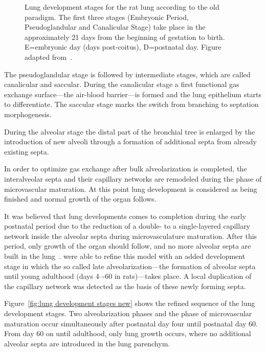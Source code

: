 \begin{figure}[htb]
	\noindent\makebox[\textwidth]{%
		\centering%
		}%
	\caption[Lung development stages]{Lung development stages for the rat lung according to the old paradigm. The first three stages (Embryonic Period, Pseudoglandular and Canalicular Stage) take place in the approximately 21 days from the beginning of gestation to birth. E=embryonic day (days post-coitus), D=postnatal day. Figure adapted from~\cite{Schittny2007a}.}
	\label{fig:lung development stages old}
\end{figure}

The pseudoglandular stage is followed by intermediate stages, which are called canalicular and saccular. During the canalicular stage a first functional gas exchange surface---the air-blood barrier---is formed and the lung epithelium starts to differentiate. The saccular stage marks the switch from branching to septation morphogenesis.

During the alveolar stage the distal part of the bronchial tree is enlarged by the introduction of new alveoli through a formation of additional septa from already existing septa. 

In order to optimize gas exchange after bulk alveolarization is completed, the interalveolar septa and their capillary networks are remodeled during the phase of microvascular maturation. At this point lung development is considered as being finished and normal growth of the organ follows.

It was believed that lung developments comes to completion during the early postnatal period due to the reduction of a double- to a single-layered capillary network inside the alveolar septa during microvasculature maturation. After this period, only growth of the organ should follow, and no more alveolar septa are built in the lung~\cite{Burri1999,Schittny2004}. \citet{Schittny2008} were able to refine this model with an added development stage in which the so called late alveolarization---the formation of alveolar septa until young adulthood (days 4–-60 in rats)---takes place. A local duplication of the capillary network was detected as the basis of these newly forming septa.

Figure~\ref{fig:lung development stages new} shows the refined sequence of the lung development stages. Two alveolarization phases and the phase of microvascular maturation occur simultaneously after postnatal day four until postnatal day 60. From day 60 on until adulthood, only lung growth occurs, where no additional alveolar septa are introduced in the lung parenchym.

